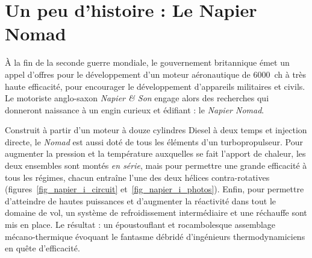\atstartofhistorysection
\section[Un peu d’histoire : le Napier Nomad]{Un peu d’histoire :\onlyamphibook{\\} Le Napier Nomad}
\label{ch_histoire_nomad}



À la fin de la seconde guerre mondiale, le gouvernement britannique émet un appel d’offres pour le développement d’un moteur aéronautique de \SI{6000}{ch} à très haute efficacité, pour encourager le développement d’appareils militaires et civils. Le motoriste anglo-saxon \textit{Napier \& Son} engage alors des recherches qui donneront naissance à un engin curieux et édifiant : le \textit{Napier Nomad}.

Construit à partir d’un moteur à douze cylindres Diesel à deux temps et injection directe, le \textit{Nomad} est aussi doté de tous les éléments d’un turbopropulseur. Pour augmenter la pression et la température auxquelles se fait l’apport de chaleur, les deux ensembles sont montés \emph{en série}, mais pour permettre une grande efficacité à tous les régimes, chacun entraîne l’une des deux hélices contra-rotatives (figures~\ref{fig_napier_i_circuit} et~\ref{fig_napier_i_photos}). Enfin, pour permettre d’atteindre de hautes puissances et d’augmenter la réactivité dans tout le domaine de vol, un système de refroidissement intermédiaire et une réchauffe sont mis en place. Le résultat : un époustouflant et rocambolesque assemblage mécano-thermique évoquant le fantasme débridé d’ingénieurs thermodynamiciens en quête d’efficacité.

